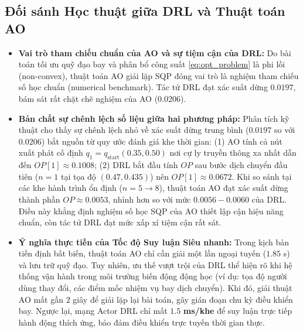 \subsection*{Đối sánh Học thuật giữa DRL và Thuật toán AO}
\begin{itemize}[leftmargin=1.5em]
    \item \textbf{Vai trò tham chiếu chuẩn của AO và sự tiệm cận của DRL:} Do bài toán tối ưu quỹ đạo bay và phân bổ công suất \eqref{eq:opt_problem} là phi lồi (non-convex), thuật toán AO giải lặp SQP đóng vai trò là nghiệm tham chiếu số học chuẩn (numerical benchmark). Tác tử DRL đạt xác suất dừng $0.0197$, bám sát rất chặt chẽ nghiệm của AO ($0.0206$).
    \item \textbf{Bản chất sự chênh lệch số liệu giữa hai phương pháp:} Phân tích kỹ thuật cho thấy sự chênh lệch nhỏ về xác suất dừng trung bình ($0.0197$ so với $0.0206$) bắt nguồn từ quy ước đánh giá khe thời gian:
    (1) AO tính cả nút xuất phát cố định $q_1 = q_{\text{start}}(0.35, 0.50)$ nơi cự ly truyền thông xa nhất dẫn đến $OP[1] \approx 0.1008$;
    (2) DRL bắt đầu tính $OP$ sau bước dịch chuyển đầu tiên ($n=1$ tại tọa độ $(0.47, 0.435)$) nên $OP[1] \approx 0.0672$.
    Khi so sánh tại các khe hành trình ổn định ($n=5 \to 8$), thuật toán AO đạt xác suất dừng thành phần $OP \approx 0.0053$, nhỉnh hơn so với mức $0.0056 - 0.0060$ của DRL. Điều này khẳng định nghiệm số học SQP của AO thiết lập cận hiệu năng chuẩn, còn tác tử DRL đạt mức xấp xỉ tiệm cận rất sát.
    \item \textbf{Ý nghĩa thực tiễn của Tốc độ Suy luận Siêu nhanh:} Trong kịch bản tiền định bất biến, thuật toán AO chỉ cần giải một lần ngoại tuyến ($1.85$ s) và lưu trữ quỹ đạo. Tuy nhiên, ưu thế vượt trội của DRL thể hiện rõ khi hệ thống vận hành trong môi trường biến động động học (ví dụ: tọa độ người dùng thay đổi, các điểm mốc nhiệm vụ bay dịch chuyển). Khi đó, giải thuật AO mất gần $2$ giây để giải lặp lại bài toán, gây gián đoạn chu kỳ điều khiển bay. Ngược lại, mạng Actor DRL chỉ mất $\mathbf{1.5}$ \textbf{ms/khe} để suy luận trực tiếp hành động thích ứng, bảo đảm điều khiển trực tuyến thời gian thực.
\end{itemize}

